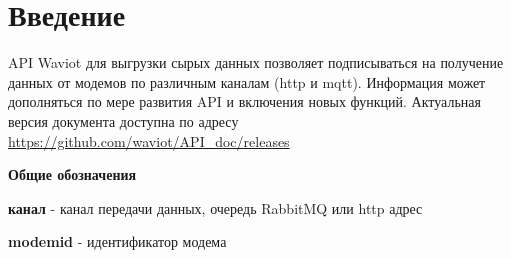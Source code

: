 \section*{Введение}

API Waviot для выгрузки сырых данных позволяет подписываться на получение данных от модемов по различным каналам (http и mqtt). Информация может дополняться по мере развития API и включения новых функций. Актуальная версия документа доступна по адресу \url{https://github.com/waviot/API_doc/releases}

\bigskip

\bigskip

\bigskip

\textbf{\Large{Общие обозначения}}

\bigskip

\textbf{канал} - канал передачи данных, очередь RabbitMQ или http адрес

\bigskip

\textbf{modem\textunderscore id} - идентификатор модема
